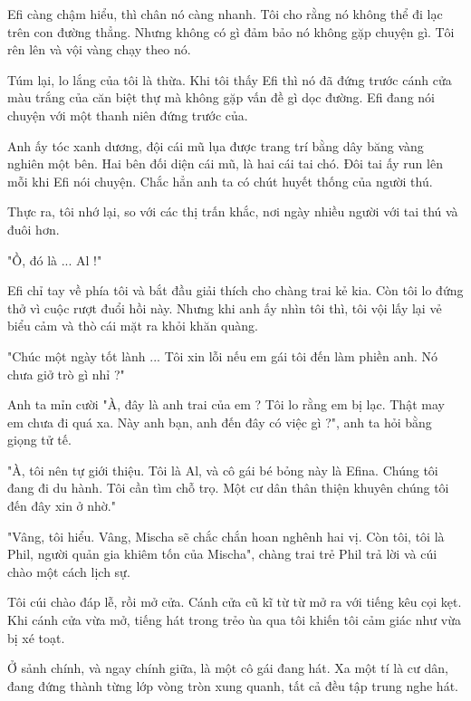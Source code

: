 Efi càng chậm hiểu, thì chân nó càng nhanh. Tôi cho rằng nó không thể đi lạc trên con đường thẳng. Nhưng không có gì đảm bảo nó không gặp chuyện gì. Tôi rên lên và vội vàng chạy theo nó.

Túm lại, lo lắng của tôi là thừa. Khi tôi thấy Efi thì nó đã đứng trước cánh cửa màu trắng của căn biệt thự mà không gặp vấn đề gì dọc đường. Efi đang nói chuyện với một thanh niên đứng trước của. 

Anh ấy tóc xanh dương, đội cái mũ lụa được trang trí bằng dây băng vàng nghiên một bên. Hai bên đối diện cái mũ, là hai cái tai chó. Đôi tai ấy run lên mỗi khi Efi nói chuyện. Chắc hẳn anh ta có chút huyết thống của người thú.

Thực ra, tôi nhớ lại, so với các thị trấn khắc, nơi ngày nhiều người với tai thú và đuôi hơn. 

"Ồ, đó là ... Al !"

Efi chỉ tay về phía tôi và bắt đầu giải thích cho chàng trai kẻ kia. Còn tôi lo đứng thở vì cuộc rượt đuổi hồi này. Nhưng khi anh ấy nhìn tôi thì, tôi vội lấy lại vẻ biểu cảm và thò cái mặt ra khỏi khăn quàng.

"Chúc một ngày tốt lành ... Tôi xin lỗi nếu em gái tôi đến làm phiền anh. Nó chưa giở trò gì nhỉ ?"

Anh ta mỉn cười "À, đây là anh trai của em ? Tôi lo rằng em bị lạc. Thật may em chưa đi quá xa. Này anh bạn, anh đến đây có việc gì ?", anh ta hỏi bằng giọng tử tế.

"À, tôi nên tự giới thiệu. Tôi là Al, và cô gái bé bỏng này là Efina. Chúng tôi đang đi du hành. Tôi cần tìm chỗ trọ. Một cư dân thân thiện khuyên chúng tôi đến đây xin ở nhờ."

"Vâng, tôi hiểu. Vâng, Mischa sẽ chắc chắn hoan nghênh hai vị. Còn tôi, tôi là Phil, người quản gia khiêm tốn của Mischa", chàng trai trẻ Phil trả lời và cúi chào một cách lịch sự. 

Tôi cúi chào đáp lễ, rồi mở cửa. Cánh cửa cũ kĩ từ từ mở ra với tiếng kêu cọi kẹt.\\



Khi cánh cửa vừa mở, tiếng hát trong trẻo ùa qua tôi khiến tôi cảm giác như vừa bị xé toạt. 

Ở sảnh chính, và ngay chính giữa, là một cô gái đang hát. Xa một tí là cư dân, đang đứng thành từng lớp vòng tròn xung quanh, tất cả đều tập trung nghe hát.

